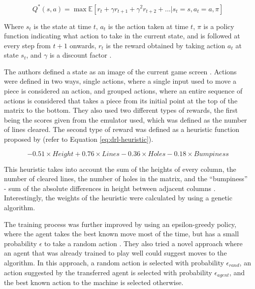 \documentclass[a4paper, 12pt]{extreport}
\begin{document}
				\begin{equation}\label{eq:q-func}
					Q^* (s,a) = \max \mathbb{E}[r_t + \gamma r_{t+1} + \gamma^2 r_{t+2} + ... | s_t = s, a_t = a, \pi] 
				\end{equation}
				
				Where $s_t$ is the state at time $t$, $a_t$ is the action taken at time $t$, $\pi$ is a policy function indicating what action to take in the current state, and is followed at every step from $t+1$ onwards, $r_t$ is the reward obtained by taking action $a_t$ at state $s_t$, and $\gamma$ is a discount factor \cite{tetris-drl}.
				
				The authors defined a state as an image of the current game screen \cite{tetris-drl}. Actions were defined in two ways, single actions, where a single input used to move a piece is considered an action, and grouped actions, where an entire sequence of actions is considered that takes a piece from its initial point at the top of the matrix to the bottom. They also used two different types of rewards, the first being the scores given from the emulator used, which was defined as the number of lines cleared. The second type of reward was defined as a heuristic function proposed by \citeauthor{lee-ai} \cite{lee-ai} (refer to Equation \ref{eq:drl-heuristic}).
				
				\begin{equation}\label{eq:drl-heuristic}
					-0.51 \times Height + 0.76 \times Lines - 0.36 \times Holes - 0.18 \times Bumpiness
				\end{equation}
				
				This heuristic takes into account the sum of the heights of every column, the number of cleared lines, the number of holes in the matrix, and the ``bumpiness'' - sum of the absolute differences in height between adjacent columns \cite{lee-ai}. Interestingly, the weights of the heuristic were calculated by using a genetic algorithm. 
				
				The training process was further improved by using an epsilon-greedy policy, where the agent takes the best known move most of the time, but has a small probability $\epsilon$ to take a random action \cite{tetris-drl}. They also tried a novel approach where an agent that was already trained to play well could suggest moves to the algorithm. In this approach, a random action is selected with probability $\epsilon_{rand}$, an action suggested by the transferred agent is selected with probability $\epsilon_{agent}$, and the best known action to the machine is selected otherwise.
				
\end{document}
